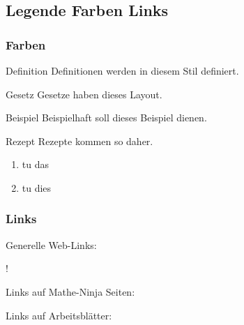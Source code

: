 %
%

\subsection{Legende Farben Links}

\subsubsection{Farben}

\begin{definition}{Definition}{}
  Definitionen werden in diesem Stil definiert.
\end{definition}
\begin{gesetz}{Gesetz}{}
  Gesetze haben dieses Layout.
\end{gesetz}
\begin{beispiel}{Beispiel}{}
  Beispielhaft soll dieses Beispiel dienen.
\end{beispiel}
\begin{rezept}{Rezept}{}
  Rezepte kommen so daher.
  \begin{enumerate}
  \item tu das
  \item tu dies
    \end{enumerate}
  \end{rezept}

\subsubsection{Links}

Generelle Web-Links:

!

Links auf Mathe-Ninja Seiten:


Links auf Arbeitsblätter:

\newpage
